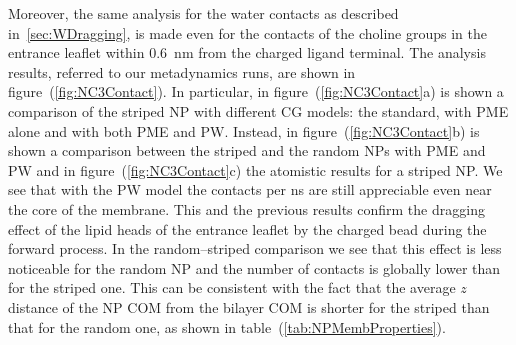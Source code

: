 Moreover, the same analysis for the water contacts as described in~\ref{sec:WDragging}, is made even for the contacts of the choline groups in the entrance leaflet within $0.6$~nm from the charged ligand terminal. The analysis results, referred to our metadynamics runs, are shown in figure~(\ref{fig:NC3Contact}). In particular, in figure~(\ref{fig:NC3Contact}a) is shown a comparison of the striped \ac{NP} with different \ac{CG} \martini models: the standard, with \ac{PME} alone and with both \ac{PME} and \ac{PW}. Instead, in figure~(\ref{fig:NC3Contact}b) is shown a comparison between the striped and the random \acp{NP} with \ac{PME} and \ac{PW} and in figure~(\ref{fig:NC3Contact}c) the atomistic results for a striped \ac{NP}. We see that with the \ac{PW} model the contacts per ns are still appreciable even near the core of the membrane. This and the previous results confirm the dragging effect of the lipid heads of the entrance leaflet by the charged bead during the forward process. In the random--striped comparison we see that this effect is less noticeable for the random \ac{NP} and the number of contacts is globally lower than for the striped one. This can be consistent with the fact that the average $z$ distance of the \ac{NP} \ac{COM} from the bilayer \ac{COM} is shorter for the striped than that for the random one, as shown in table~(\ref{tab:NPMembProperties}). 

\clearpage
